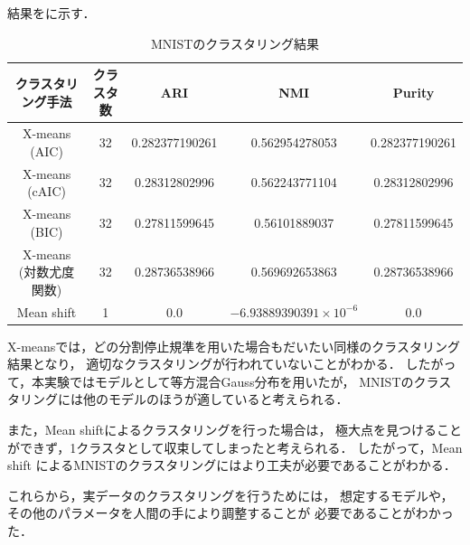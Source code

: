 結果をに示す．

\begin{table}[htb]
  \centering
  \caption{MNISTのクラスタリング結果}
  \label{table:mnist}
  \begin{tabular}{|c|c|c|c|c|} \hline
    クラスタリング手法 & クラスタ数 & ARI & NMI & Purity \\\hline
    X-means (AIC) & 32 & 0.282377190261 & 0.562954278053 & 0.282377190261\\
    X-means (cAIC) & 32 & 0.28312802996 & 0.562243771104 & 0.28312802996\\
    X-means (BIC) & 32 & 0.27811599645 & 0.56101889037 & 0.27811599645\\
    X-means (対数尤度関数)& 32 & 0.28736538966 & 0.569692653863 & 0.28736538966\\
    Mean shift & 1 & 0.0 & $-6.93889390391 \times 10^{-6}$ & 0.0\\\hline
  \end{tabular}
\end{table}

X-meansでは，どの分割停止規準を用いた場合もだいたい同様のクラスタリング結果となり，
適切なクラスタリングが行われていないことがわかる．
したがって，本実験ではモデルとして等方混合Gauss分布を用いたが，
MNISTのクラスタリングには他のモデルのほうが適していると考えられる．

また，Mean shiftによるクラスタリングを行った場合は，
極大点を見つけることができず，1クラスタとして収束してしまったと考えられる．
したがって，Mean shift によるMNISTのクラスタリングにはより工夫が必要であることがわかる．

これらから，実データのクラスタリングを行うためには，
想定するモデルや，その他のパラメータを人間の手により調整することが
必要であることがわかった．

